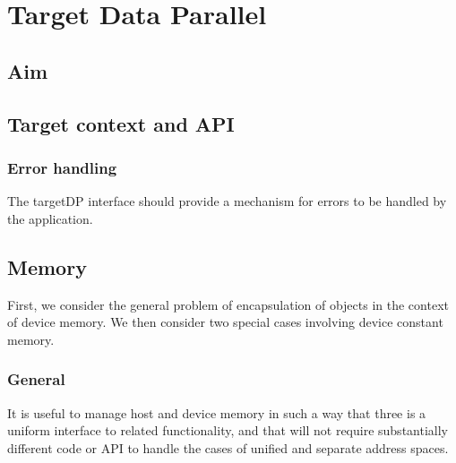%
%
%
%
%

\section{Target Data Parallel}

\subsection{Aim}

\subsection{Target context and API}

\subsubsection{Error handling}

The targetDP interface should provide a mechanism for errors to be
handled by the application.

\subsection{Memory}

First, we consider the general problem of encapsulation of objects
in the context of device memory. We then consider two special cases
involving device constant memory.

\subsubsection{General}

It is useful to manage host and device memory in such a way that
three is a uniform interface to related functionality, and that
will not require substantially different code or API to handle the cases of
unified and separate address spaces.

